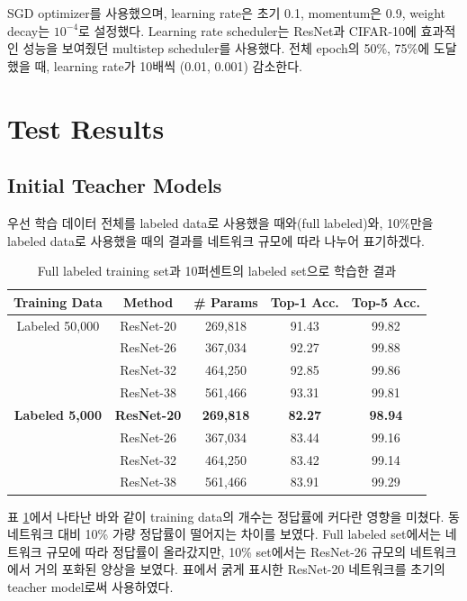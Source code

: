 \documentclass[a4paper, 10pt]{article}
\begin{document}
SGD optimizer를 사용했으며, learning rate은 초기 0.1, momentum은 0.9, weight
decay는 $10^{-4}$로 설정했다. Learning rate scheduler는 ResNet과 CIFAR-10에
효과적인 성능을 보여줬던 multistep scheduler를 사용했다. 전체 epoch의 50\%,
75\%에 도달했을 때, learning rate가 10배씩 (0.01, 0.001) 감소한다.


\section{Test Results}
\subsection{Initial Teacher Models}
우선 학습 데이터 전체를 labeled data로 사용했을 때와(full labeled)와, 10\%만을
labeled data로 사용했을 때의 결과를 네트워크 규모에 따라 나누어 표기하겠다.
\begin{table}[!h]
  \center
  \begin{tabular}{|c|c|c|cc|}
\hline
Training Data & Method & \# Params & Top-1 Acc. & Top-5 Acc. \\ \hline
Labeled 50,000 & ResNet-20 & 269,818 & 91.43 & 99.82 \\
               & ResNet-26 & 367,034 & 92.27 & 99.88 \\
               & ResNet-32 & 464,250 & 92.85 & 99.86 \\
               & ResNet-38 & 561,466 & 93.31 & 99.81 \\ \hline
\textbf{Labeled 5,000}  & \textbf{ResNet-20} & \textbf{269,818} & \textbf{82.27}
& \textbf{98.94} \\
               & ResNet-26 & 367,034 & 83.44 & 99.16 \\
               & ResNet-32 & 464,250 & 83.42 & 99.14 \\
               & ResNet-38 & 561,466 & 83.91 & 99.29 \\ \hline
  \end{tabular}
  \caption{Full labeled training set과 10퍼센트의 labeled set으로 학습한 결과}
  \label{fulland10}
\end{table}
표 \ref{fulland10}에서 나타난 바와 같이 training data의 개수는 정답률에 커다란
영향을 미쳤다. 동 네트워크 대비 10\% 가량 정답률이 떨어지는 차이를 보였다. Full
labeled set에서는 네트워크 규모에 따라 정답률이 올라갔지만, 10\% set에서는
ResNet-26 규모의 네트워크에서 거의 포화된 양상을 보였다. 표에서 굵게 표시한
ResNet-20 네트워크를 초기의 teacher model로써 사용하였다.
\end{document}
